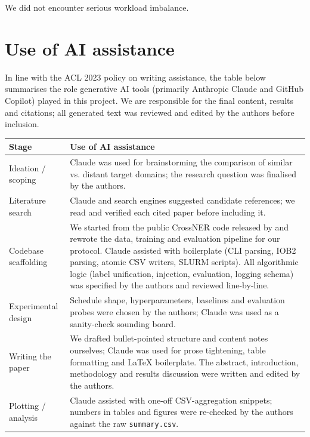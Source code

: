 \documentclass[11pt]{article}
\begin{document}
\noindent We did not encounter serious workload imbalance.

\section{Use of AI assistance}
\label{sec:app-ai}

In line with the ACL 2023 policy on writing assistance, the table below
summarises the role generative AI tools (primarily Anthropic Claude and
GitHub Copilot) played in this project. We are responsible for the final
content, results and citations; all generated text was reviewed and edited
by the authors before inclusion.

\begin{table}[h]
  \centering
  \small
  \begin{tabular}{p{2.4cm}p{4.6cm}}
    \toprule
    \textbf{Stage} & \textbf{Use of AI assistance} \\
    \midrule
    Ideation / scoping
      & Claude was used for brainstorming the comparison of similar vs.
        distant target domains; the research question was finalised by the
        authors. \\
    Literature search
      & Claude and search engines suggested candidate references; we read
        and verified each cited paper before including it. \\
    Codebase scaffolding
      & We started from the public CrossNER code released by
        \citet{liu-etal-2021-crossner} and rewrote the data, training and
        evaluation pipeline for our protocol. Claude assisted with
        boilerplate (CLI parsing, IOB2 parsing, atomic CSV writers, SLURM
        scripts). All algorithmic logic (label unification, injection,
        evaluation, logging schema) was specified by the authors and
        reviewed line-by-line. \\
    Experimental design
      & Schedule shape, hyperparameters, baselines and evaluation probes
        were chosen by the authors; Claude was used as a sanity-check
        sounding board. \\
    Writing the paper
      & We drafted bullet-pointed structure and content notes ourselves;
        Claude was used for prose tightening, table formatting and
        LaTeX boilerplate. The abstract, introduction, methodology and
        results discussion were written and edited by the authors. \\
    Plotting / analysis
      & Claude assisted with one-off CSV-aggregation snippets; numbers in
        tables and figures were re-checked by the authors against the raw
        \texttt{summary.csv}. \\
    \bottomrule
  \end{tabular}
\end{table}
\end{document}
